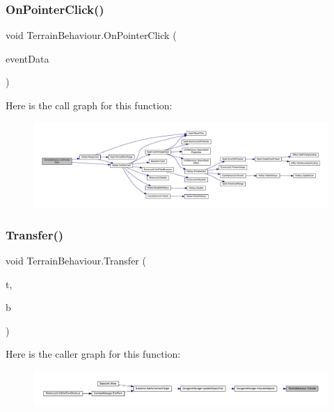 \subsubsection{\texorpdfstring{OnPointerClick()}{OnPointerClick()}}
{\footnotesize\ttfamily void Terrain\+Behaviour.\+On\+Pointer\+Click (\begin{DoxyParamCaption}\item[{Pointer\+Event\+Data}]{event\+Data }\end{DoxyParamCaption})}

Here is the call graph for this function\+:\nopagebreak
\begin{figure}[H]
\begin{center}
\leavevmode
\includegraphics[width=350pt]{class_terrain_behaviour_a81acf1d578876b7a0870fdb0880c52a9_cgraph}
\end{center}
\end{figure}
\mbox{\label{class_terrain_behaviour_a97b6323eafb1c26361878bb1d37f4556}} 
\subsubsection{\texorpdfstring{Transfer()}{Transfer()}}
{\footnotesize\ttfamily void Terrain\+Behaviour.\+Transfer (\begin{DoxyParamCaption}\item[{\mbox{\hyperlink{class_tile}{Tile}}}]{t,  }\item[{\mbox{\hyperlink{class_base_terrain}{Base\+Terrain}}}]{b }\end{DoxyParamCaption})}

Here is the caller graph for this function\+:\nopagebreak
\begin{figure}[H]
\begin{center}
\leavevmode
\includegraphics[width=350pt]{class_terrain_behaviour_a97b6323eafb1c26361878bb1d37f4556_icgraph}
\end{center}
\end{figure}
\mbox{\label{class_terrain_behaviour_a1f1234296c90b45abf0ad3ee6f9e78ac}} 
